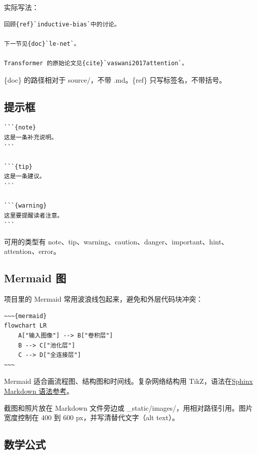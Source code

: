\documentclass[UTF8,fontset=none,a4paper,11pt]{ctexart}
\newcommand{\code}[1]{{\CJKsetecglue{}\ttfamily #1}}
\begin{document}
实际写法：

\begin{lstlisting}
回顾{ref}`inductive-bias`中的讨论。

下一节见{doc}`le-net`。

Transformer 的原始论文见{cite}`vaswani2017attention`。
\end{lstlisting}

\code{\{doc\}} 的路径相对于 \code{source/}，不带 \code{.md}。\code{\{ref\}} 只写标签名，不带括号。

\subsection{提示框}\label{sec:admonitions}

\begin{lstlisting}
```{note}
这是一条补充说明。
```

```{tip}
这是一条建议。
```

```{warning}
这里要提醒读者注意。
```
\end{lstlisting}

可用的类型有 \code{note}、\code{tip}、\code{warning}、\code{caution}、\code{danger}、\code{important}、\code{hint}、\code{attention}、\code{error}。

\subsection{Mermaid 图}\label{sec:mermaid-syntax}

项目里的 Mermaid 常用波浪线包起来，避免和外层代码块冲突：

\begin{lstlisting}
~~~{mermaid}
flowchart LR
    A["输入图像"] --> B["卷积层"]
    B --> C["池化层"]
    C --> D["全连接层"]
~~~
\end{lstlisting}

Mermaid 适合画流程图、结构图和时间线。复杂网络结构用 TikZ，语法在\href{https://github.com/ulink-deep-learning-club/ulink-deeplearningclub-handouts/blob/main/source/appendix/sphinx-guide/index.md}{Sphinx Markdown 语法参考}。

截图和照片放在 Markdown 文件旁边或 \code{\_static/images/}，用相对路径引用。图片宽度控制在 400 到 600 px，并写清替代文字（alt text）。

\subsection{数学公式}\label{sec:math-syntax}
\end{document}
